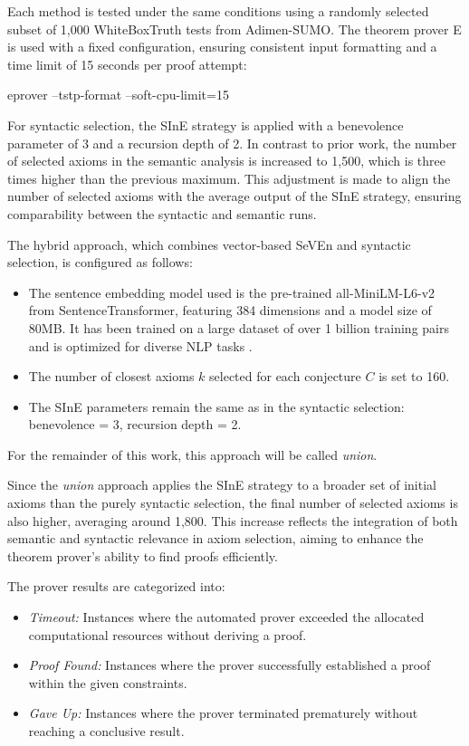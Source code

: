 \documentclass[english,version-2020-11]{uzl-thesis}
\begin{document}
Each method is tested under the same conditions using a randomly selected subset of 1,000 WhiteBoxTruth tests from Adimen-SUMO. The theorem prover E is used with a fixed configuration, ensuring consistent input formatting and a time limit of 15 seconds per proof attempt:

\begin{Pseudocode}[morekeywords = {add, create}, deletekeywords={to}, numbers=left,
    caption = {Prover E configuration}]
    eprover --tstp-format --soft-cpu-limit=15
\end{Pseudocode}

For syntactic selection, the SInE strategy is applied with a benevolence parameter of 3 and a recursion depth of 2. In contrast to prior work, the number of selected axioms in the semantic analysis is increased to 1,500, which is three times higher than the previous maximum. This adjustment is made to align the number of selected axioms with the average output of the SInE strategy, ensuring comparability between the syntactic and semantic runs.

The hybrid approach, which combines vector-based SeVEn and syntactic selection, is configured as follows:

\begin{itemize}
    \item The sentence embedding model used is the pre-trained all-MiniLM-L6-v2 from SentenceTransformer, featuring 384 dimensions and a model size of 80MB. It has been trained on a large dataset of over 1 billion training pairs and is optimized for diverse NLP tasks \cite{Reimers2019, Sentencetransformers2019}.
    \item The number of closest axioms \( k \) selected for each conjecture \( C \) is set to 160.
    \item The SInE parameters remain the same as in the syntactic selection: benevolence = 3, recursion depth = 2.
\end{itemize}

For the remainder of this work, this approach will be called \textit{union}.

Since the \textit{union} approach applies the SInE strategy to a broader set of initial axioms than the purely syntactic selection, the final number of selected axioms is also higher, averaging around 1,800. This increase reflects the integration of both semantic and syntactic relevance in axiom selection, aiming to enhance the theorem prover’s ability to find proofs efficiently.

The prover results are categorized into:
\begin{itemize}
    \item \textit{Timeout:} Instances where the automated prover exceeded the allocated computational resources without deriving a proof.
    \item \textit{Proof Found:} Instances where the prover successfully established a proof within the given constraints.
    \item \textit{Gave Up:} Instances where the prover terminated prematurely without reaching a conclusive result.
\end{itemize}
\end{document}
